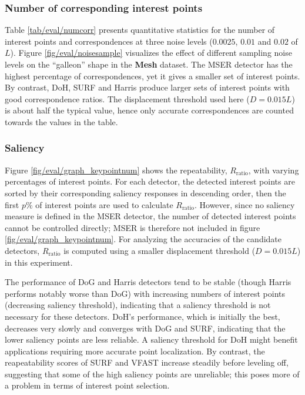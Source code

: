 \subsubsection{Number of corresponding interest points}

Table \ref{tab/eval/numcorr} presents quantitative statistics for the number of interest points and correspondences at three noise levels ($0.0025$, $0.01$ and $0.02$ of $L$). Figure \ref{fig/eval/noisesample} visualizes the effect of different sampling noise levels on the ``galleon'' shape in the \textbf{Mesh} dataset. The MSER detector has the highest percentage of correspondences, yet it gives a smaller set of interest points. By contrast, DoH, SURF and Harris produce larger sets of interest points with good correspondence ratios. The displacement threshold used here ($D = 0.015L$) is about half the typical value, hence only accurate correspondences are counted towards the values in the table. 

\subsubsection{Saliency}

Figure \ref{fig/eval/graph_keypointnum} shows the repeatability, $R_\textrm{ratio}$, with varying percentages of interest points. For each detector, the detected interest points are sorted by their corresponding saliency responses in descending order, then the first $p\%$ of interest points are used to calculate $R_\mathrm{ratio}$. However, since no saliency measure is defined in the MSER detector, the number of detected interest points cannot be controlled directly; MSER is therefore not included in figure \ref{fig/eval/graph_keypointnum}. For analyzing the accuracies of the candidate detectors, $R_\textrm{ratio}$ is computed using a smaller displacement threshold ($D = 0.015L$) in this experiment.   

The performance of DoG and Harris detectors tend to be stable (though Harris performs notably worse than DoG) with increasing numbers of interest points (\ie decreasing saliency threshold), indicating that a saliency threshold is not necessary for these detectors. DoH's performance, which is initially the best, decreases very slowly and converges with DoG and SURF, indicating that the lower saliency points are less reliable. A saliency threshold for DoH might benefit applications requiring more accurate point localization. By contrast, the reapeatability scores of SURF and VFAST increase steadily before leveling off, suggesting that some of the high saliency points are unreliable; this poses more of a problem in terms of interest point selection. 

